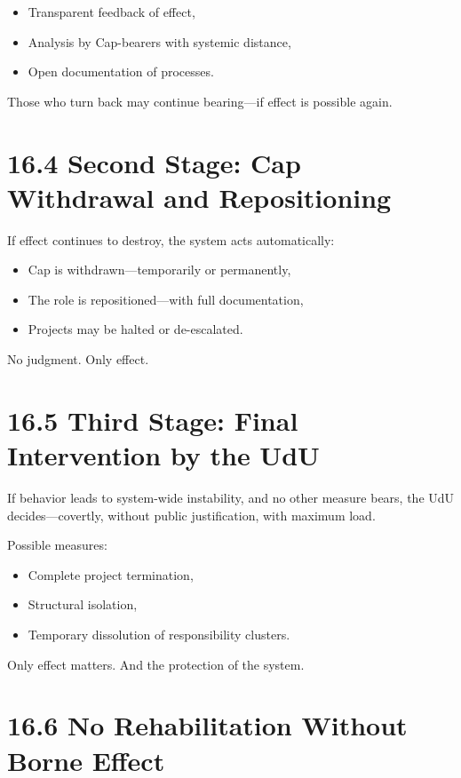 \documentclass[12pt,a4paper]{book}
\begin{document}
\begin{itemize}
    \item Transparent feedback of effect,
    \item Analysis by Cap-bearers with systemic distance,
    \item Open documentation of processes.
\end{itemize}

Those who turn back may continue bearing—if effect is possible again.

\section*{16.4 Second Stage: Cap Withdrawal and Repositioning}

If effect continues to destroy,  
the system acts automatically:

\begin{itemize}
    \item Cap is withdrawn—temporarily or permanently,
    \item The role is repositioned—with full documentation,
    \item Projects may be halted or de-escalated.
\end{itemize}

No judgment. Only effect.

\section*{16.5 Third Stage: Final Intervention by the UdU}

If behavior leads to system-wide instability,  
and no other measure bears,  
the UdU decides—covertly, without public justification, with maximum load.

Possible measures:

\begin{itemize}
    \item Complete project termination,
    \item Structural isolation,
    \item Temporary dissolution of responsibility clusters.
\end{itemize}

Only effect matters.  
And the protection of the system.

\section*{16.6 No Rehabilitation Without Borne Effect}
\end{document}
